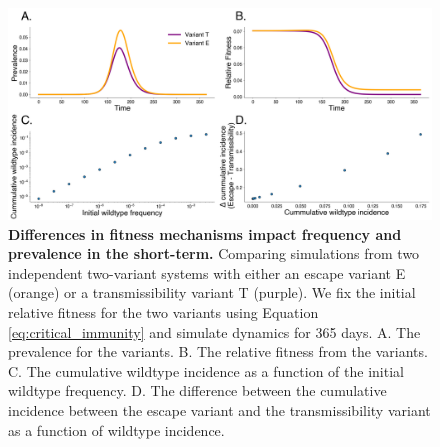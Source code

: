 \documentclass[11pt,oneside,letterpaper]{article}
\begin{document}
\begin{figure}[h]
    \centering
    \includegraphics[width=1.0\linewidth]{./supplementary_figures/short_term_divergence.png}
    \caption{
      \textbf{Differences in fitness mechanisms impact frequency and prevalence in the short-term.}
      Comparing simulations from two independent two-variant systems with either an escape variant E (orange) or a transmissibility variant T (purple).
      We fix the initial relative fitness for the two variants using Equation \ref{eq:critical_immunity} and simulate dynamics for 365 days.
      A. The prevalence for the variants.
      B. The relative fitness from the variants.
      C. The cumulative wildtype incidence as a function of the initial wildtype frequency.
      D. The difference between the cumulative incidence between the escape variant and the transmissibility variant as a function of wildtype incidence.
    }
    \label{fig:short_term_divergence}
\end{figure}
\end{document}

